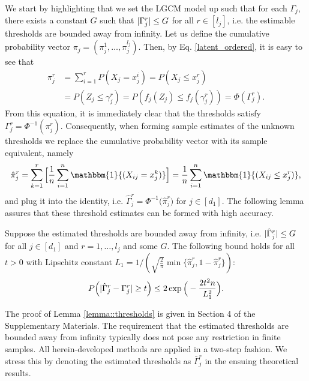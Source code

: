 We start by highlighting that we set the LGCM model up such that for each $\Gamma_j$, there exists a constant $G$ such that $\lvert\Gamma^r_j\rvert \leq G$ for all $r \in [l_{j}]$, i.e. the estimable thresholds are bounded away from infinity. Let us define the cumulative probability vector $\pi_j = (\pi^1_j, \dots, \pi^{l_{j}}_j)$. Then, by Eq. \eqref{latent_ordered}, it is easy to see that
\begin{equation}\label{thresholds_identity}
    \begin{split}
        \pi^r_j &= \sum_{i=1}^r P(X_j = x^i_j) = P(X_j \leq x^r_j) \\
        &= P(Z_j \leq \gamma_j^r) = P(f_j(Z_j) \leq f_j(\gamma_j^r)) = \Phi(\Gamma^r_j).
    \end{split}
\end{equation}
From this equation, it is immediately clear that the thresholds satisfy $\Gamma^{r}_{j} = \Phi^{-1}( \pi^r_j )$. Consequently, when forming sample estimates of the unknown thresholds we replace the cumulative probability vector with its sample equivalent, namely
\begin{equation}
    \hat\pi^r_j = \sum_{k=1}^r \Big[\frac{1}{n} \sum_{i=1}^n \mathbbm{1}{(X_{ij} = x^k_j)}\Big] = \frac{1}{n} \sum_{i=1}^n \mathbbm{1}{(X_{ij} \leq x^r_j)},
\end{equation}
and plug it into the identity, i.e. $\hat\Gamma^r_j = \Phi^{-1}\big( \hat\pi^r_j \big)$ for $j \in [d_1]$. The following lemma assures that these threshold estimates can be formed with high accuracy.
\begin{lemma}\label{lemma::thresholds}
    Suppose the estimated thresholds are bounded away from infinity, i.e. \(\lvert\hat\Gamma^r_j\rvert \leq G\) for all $j \in [d_1]$ and $r = 1, \dots, l_j$ and some \(G\). The following bound holds for all $t > 0$ with Lipschitz constant \(L_1 = 1/(\sqrt{\frac{2}{\pi}} \min\{\hat\pi^r_j, 1- \hat\pi^r_j\})\):
    \begin{equation*}
        P\Big(\Abs{\hat\Gamma_j^r - \Gamma_j^r} \geq t \Big) \leq 2\exp{\Big(- \frac{2t^2n}{L_1^2}\Big)}.
    \end{equation*}
\end{lemma}

The proof of Lemma \ref{lemma::thresholds} is given in Section 4 %
of the Supplementary Materials. The requirement that the estimated thresholds are bounded away from infinity typically does not pose any restriction in finite samples. All herein-developed methods are applied in a two-step fashion. We stress this by denoting the estimated thresholds as $\bar{\Gamma}_j^r$ in the ensuing theoretical results.

